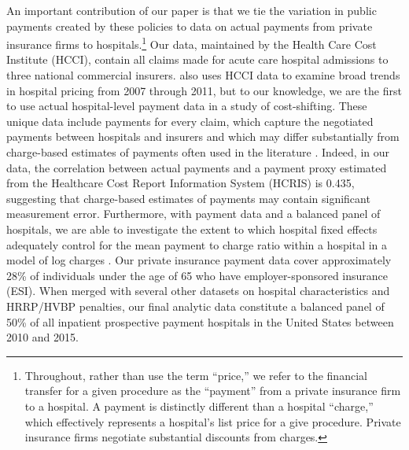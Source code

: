 \documentclass[12pt]{article}
\begin{document}
An important contribution of our paper is that we tie the variation in public payments created by these policies to data on actual payments from private insurance firms to hospitals.\footnote{Throughout, rather than use the term ``price,'' we refer to the financial transfer for a given procedure as the ``payment'' from a private insurance firm to a hospital.  A payment is distinctly different than a hospital ``charge,'' which effectively represents a hospital's list price for a give procedure. Private insurance firms negotiate substantial discounts from charges.}  Our data, maintained by the Health Care Cost Institute (HCCI), contain all claims made for acute care hospital admissions to three national commercial insurers. \cite{cooper2015} also uses HCCI data to examine broad trends in hospital pricing from 2007 through 2011, but to our knowledge, we are the first to use actual hospital-level payment data in a study of cost-shifting. These unique data include payments for every claim, which capture the negotiated payments between hospitals and insurers and which may differ substantially from charge-based estimates of payments often used in the literature \citep{dafny2009,dranove2017}. Indeed, in our data, the correlation between actual payments and a payment proxy estimated from the Healthcare Cost Report Information System (HCRIS) is 0.435, suggesting that charge-based estimates of payments may contain significant measurement error.  Furthermore, with payment data and a balanced panel of hospitals, we are able to investigate the extent to which hospital fixed effects adequately control for the mean payment to charge ratio within a hospital in a model of log charges \citep{cutler2000}. Our private insurance payment data cover approximately 28\% of individuals under the age of 65 who have employer-sponsored insurance (ESI). When merged with several other datasets on hospital characteristics and HRRP/HVBP penalties, our final analytic data constitute a balanced panel of 50\% of all inpatient prospective payment hospitals in the United States between 2010 and 2015.
\end{document}
